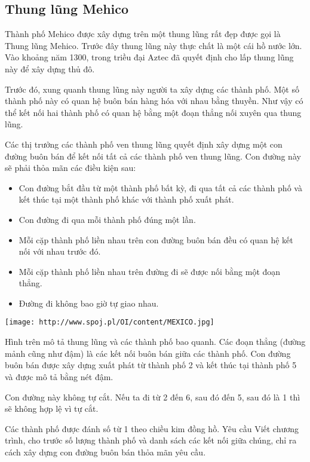 \subsection{   Thung lũng Mehico  }

   Thành phố Mehico được xây dựng trên một thung lũng rất đẹp được gọi là Thung lũng Mehico. Trước đây thung lũng này thực chất là một cái hồ nước lớn. Vào khoảng năm 1300, trong triều đại Aztec đã quyết định cho lấp thung lũng này để xây dựng thủ đô.  

   Trước đó, xung quanh thung lũng này người ta xây dựng các thành phố. Một số thành phố này có quan hệ buôn bán hàng hóa với nhau bằng thuyền. Như vậy có thể kết nối hai thành phố có quan hệ bằng một đoạn thẳng nối xuyên qua thung lũng.  

   Các thị trưởng các thành phố ven thung lũng quyết định xây dựng một con đường buôn bán để kết nối tất cả các thành phố ven thung lũng. Con đường này sẽ phải thỏa mãn các điều kiện sau:  
\begin{itemize}
	\item     Con đường bắt đầu từ một thành phố bất kỳ, đi qua tất cả các thành phố và kết thúc tại một thành phố khác với thành phố xuất phát.   
	\item     Con đường đi qua mỗi thành phố đúng một lần.   
	\item     Mỗi cặp thành phố liền nhau trên con đường buôn bán đều có quan hệ kết nối với nhau trước đó.   
	\item     Mỗi cặp thành phố liền nhau trên đường đi sẽ được nối bằng một đoạn thẳng.   
	\item     Đường đi không bao giờ tự giao nhau.   
\end{itemize}


\texttt{[image: http://www.spoj.pl/OI/content/MEXICO.jpg]}

   Hình trên mô tả thung lũng và các thành phố bao quanh. Các đoạn thẳng (đường mảnh cũng như đậm) là các kết nối buôn bán giữa các thành phố. Con đường buôn bán được xây dựng xuất phát từ thành phố 2 và kết thúc tại thành phố 5 và được mô tả bằng nét đậm.  

   Con đường này không tự cắt. Nếu ta đi từ 2 đến 6, sau đó đến 5, sau đó là 1 thì sẽ không hợp lệ vì tự cắt.  

   Các thành phố được đánh số từ 1 theo chiều kim đồng hồ.
Yêu cầu
Viết chương trình, cho trước số lượng thành phố và danh sách các kết nối giữa chúng, chỉ ra cách xây dựng con đường buôn bán thỏa mãn yêu cầu.